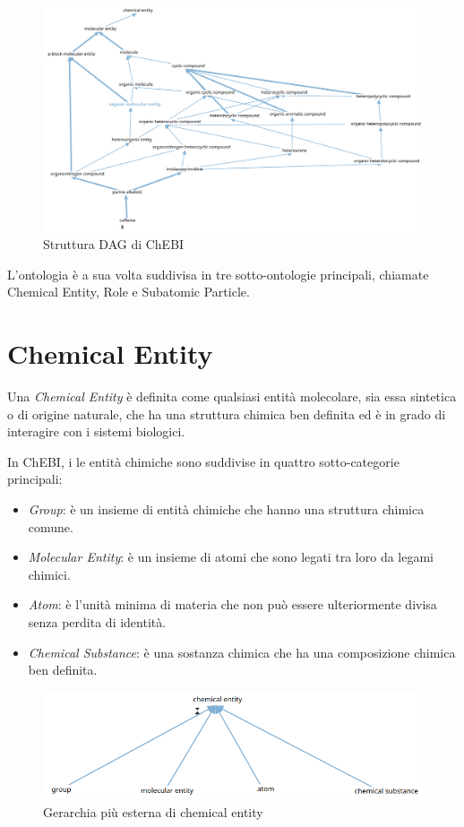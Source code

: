 \documentclass[12pt,a4paper,openright,twoside]{book}
\begin{document}
\begin{figure}[H]
	\centering
	\includegraphics[width=\linewidth]{figures/caffeine.png}
	\caption{Struttura DAG di ChEBI}
	\label{fig:Caffeine}
\end{figure}

L'ontologia è a sua volta suddivisa in tre sotto-ontologie principali, chiamate Chemical Entity, Role e Subatomic Particle.

\section{Chemical Entity}

Una \textit{Chemical Entity} è definita come qualsiasi entità molecolare, sia essa sintetica o di origine naturale, che ha una struttura chimica ben definita ed è in grado di interagire con i sistemi biologici.

In ChEBI, i le entità chimiche sono suddivise in quattro sotto-categorie principali:
\begin{itemize}
	\item \textit{Group}: è un insieme di entità chimiche che hanno una struttura chimica comune.
	\item \textit{Molecular Entity}: è un insieme di atomi che sono legati tra loro da legami chimici.
	\item \textit{Atom}: è l'unità minima di materia che non può essere ulteriormente divisa senza perdita di identità.
	\item \textit{Chemical Substance}: è una sostanza chimica che ha una composizione chimica ben definita.
\end{itemize}


\begin{figure}[H]
	\centering
	\includegraphics[width=\linewidth]{figures/chemical-entity.png}
	\caption{Gerarchia più esterna di chemical entity}
	\label{fig:ChemicalEntity}
\end{figure}
\end{document}
